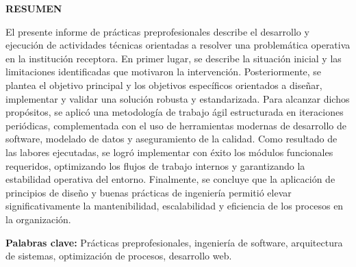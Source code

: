 \clearpage
\thispagestyle{empty}

\begin{center}
  {\fontsize{14pt}{16pt}\selectfont\bfseries RESUMEN}
\end{center}
\vspace{0.5cm}

\fontsize{12pt}{14pt}\selectfont
El presente informe de prácticas preprofesionales describe el desarrollo y ejecución de actividades técnicas orientadas a resolver una problemática operativa en la institución receptora. En primer lugar, se describe la situación inicial y las limitaciones identificadas que motivaron la intervención. Posteriormente, se plantea el objetivo principal y los objetivos específicos orientados a diseñar, implementar y validar una solución robusta y estandarizada. Para alcanzar dichos propósitos, se aplicó una metodología de trabajo ágil estructurada en iteraciones periódicas, complementada con el uso de herramientas modernas de desarrollo de software, modelado de datos y aseguramiento de la calidad. Como resultado de las labores ejecutadas, se logró implementar con éxito los módulos funcionales requeridos, optimizando los flujos de trabajo internos y garantizando la estabilidad operativa del entorno. Finalmente, se concluye que la aplicación de principios de diseño y buenas prácticas de ingeniería permitió elevar significativamente la mantenibilidad, escalabilidad y eficiencia de los procesos en la organización.

\vspace{0.8cm}
\noindent\textbf{Palabras clave:} Prácticas preprofesionales, ingeniería de software, arquitectura de sistemas, optimización de procesos, desarrollo web.
\clearpage
